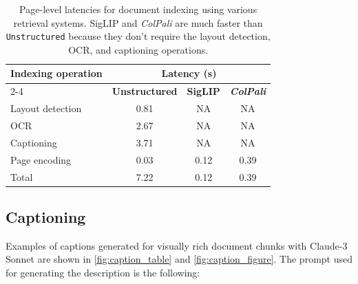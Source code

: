 \begin{table}[ht]
    \centering
    \begin{tabular}{l|c|c|c}
    \multirow{2}{*}{\textbf{Indexing operation}} & \multicolumn{3}{c}{\textbf{Latency (s)}}                                                                      \\ \cline{2-4} 
                                                 & \multicolumn{1}{l|}{\textbf{Unstructured}} & \multicolumn{1}{l|}{\textbf{SigLIP}} & \textit{\textbf{ColPali}} \\
    \hline
    Layout detection                             & \multicolumn{1}{c|}{0.81}                  & \multicolumn{1}{c|}{NA}              & NA                                            \\
    OCR                                          & \multicolumn{1}{c|}{2.67}                  & \multicolumn{1}{c|}{NA}              & NA                                            \\
    Captioning                                   & \multicolumn{1}{c|}{3.71}                  & \multicolumn{1}{c|}{NA}              & NA                                            \\
    Page encoding                                & \multicolumn{1}{c|}{0.03}                  & \multicolumn{1}{c|}{0.12}            & 0.39                                          \\ \hline
    Total                                        & \multicolumn{1}{c|}{7.22}                  & \multicolumn{1}{c|}{0.12}            & 0.39
    \end{tabular}
    \caption[Page-level indexing latencies]{Page-level latencies for document indexing using various retrieval systems. SigLIP and \textit{ColPali} are much faster than \texttt{Unstructured} because they don't require the layout detection, OCR, and captioning operations.}
    \label{table:latency-comparison}
\end{table}


\subsection{Captioning}
\label{paragraph:captioning} 

Examples of captions generated for visually rich document chunks with Claude-3 Sonnet are shown in \autoref{fig:caption_table} and \autoref{fig:caption_figure}. The prompt used for generating the description is the following:

